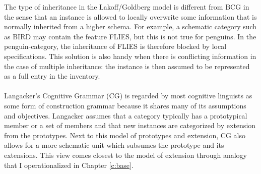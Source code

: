 The type of inheritance in the Lakoff/Goldberg model is different from BCG in the sense that an instance is allowed to locally overwrite some information that is normally inherited from a higher schema. For example, a schematic category such as BIRD may contain the feature FLIES, but this is not true for penguins. In the penguin-category, the inheritance of FLIES is therefore blocked by local specifications. This solution is also handy when there is conflicting information in the case of multiple inheritance: the instance is then assumed to be represented as a full entry in the inventory.
\\
\\
 Langacker's Cognitive Grammar (CG) is regarded by most cognitive linguists as some form of construction grammar because it shares many of its assumptions and objectives. Langacker assumes that a category typically has a prototypical member or a set of members and that new instances are categorized by extension from the prototypes. Next to this model of prototypes and extension, CG also allows for a more schematic unit which subsumes the prototype and its extensions. This view comes closest to the model of extension through analogy that I operationalized in Chapter \ref{c:base}.

